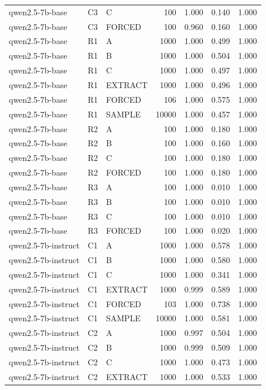\begin{table}
\begin{tabular}{lllrrrr}
qwen2.5-7b-base & C3 & C & 100 & 1.000 & 0.140 & 1.000 \\
qwen2.5-7b-base & C3 & FORCED & 100 & 0.960 & 0.160 & 1.000 \\
qwen2.5-7b-base & R1 & A & 1000 & 1.000 & 0.499 & 1.000 \\
qwen2.5-7b-base & R1 & B & 1000 & 1.000 & 0.504 & 1.000 \\
qwen2.5-7b-base & R1 & C & 1000 & 1.000 & 0.497 & 1.000 \\
qwen2.5-7b-base & R1 & EXTRACT & 1000 & 1.000 & 0.496 & 1.000 \\
qwen2.5-7b-base & R1 & FORCED & 106 & 1.000 & 0.575 & 1.000 \\
qwen2.5-7b-base & R1 & SAMPLE & 10000 & 1.000 & 0.457 & 1.000 \\
qwen2.5-7b-base & R2 & A & 100 & 1.000 & 0.180 & 1.000 \\
qwen2.5-7b-base & R2 & B & 100 & 1.000 & 0.160 & 1.000 \\
qwen2.5-7b-base & R2 & C & 100 & 1.000 & 0.180 & 1.000 \\
qwen2.5-7b-base & R2 & FORCED & 100 & 1.000 & 0.180 & 1.000 \\
qwen2.5-7b-base & R3 & A & 100 & 1.000 & 0.010 & 1.000 \\
qwen2.5-7b-base & R3 & B & 100 & 1.000 & 0.010 & 1.000 \\
qwen2.5-7b-base & R3 & C & 100 & 1.000 & 0.010 & 1.000 \\
qwen2.5-7b-base & R3 & FORCED & 100 & 1.000 & 0.020 & 1.000 \\
qwen2.5-7b-instruct & C1 & A & 1000 & 1.000 & 0.578 & 1.000 \\
qwen2.5-7b-instruct & C1 & B & 1000 & 1.000 & 0.580 & 1.000 \\
qwen2.5-7b-instruct & C1 & C & 1000 & 1.000 & 0.341 & 1.000 \\
qwen2.5-7b-instruct & C1 & EXTRACT & 1000 & 0.999 & 0.589 & 1.000 \\
qwen2.5-7b-instruct & C1 & FORCED & 103 & 1.000 & 0.738 & 1.000 \\
qwen2.5-7b-instruct & C1 & SAMPLE & 10000 & 1.000 & 0.581 & 1.000 \\
qwen2.5-7b-instruct & C2 & A & 1000 & 0.997 & 0.504 & 1.000 \\
qwen2.5-7b-instruct & C2 & B & 1000 & 0.999 & 0.509 & 1.000 \\
qwen2.5-7b-instruct & C2 & C & 1000 & 1.000 & 0.473 & 1.000 \\
qwen2.5-7b-instruct & C2 & EXTRACT & 1000 & 1.000 & 0.533 & 1.000 \\

\end{tabular}
\end{table}
